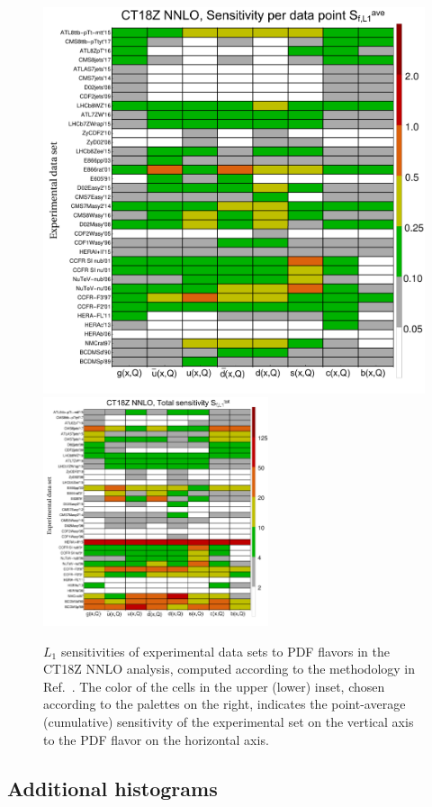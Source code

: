 \begin{figure}[p]
\center
  \includegraphics[width=0.59 \textwidth]{./fig/SuppMat/ave_S_bycolor_ct18znn.pdf}\\ 
  \includegraphics[width=0.59\textwidth]{./fig/SuppMat/total_S_bycolor_ct18znn.pdf}
        	\caption{$L_1$ sensitivities of experimental data
                  sets to PDF flavors in the CT18Z NNLO analysis,
                  computed according to the methodology in
               Ref.~\cite{Wang:2018heo}. The color of the cells
                  in the upper (lower) inset, 
                  chosen according to the palettes on the right,
                  indicates the point-average
                  (cumulative) sensitivity of the experimental set
                  on the vertical axis to the PDF flavor
                  on the horizontal axis. 
		\label{fig:CT18Zquilts}}
\end{figure}

\clearpage

\subsection{Additional histograms}
\label{sec:Supp-hist}


